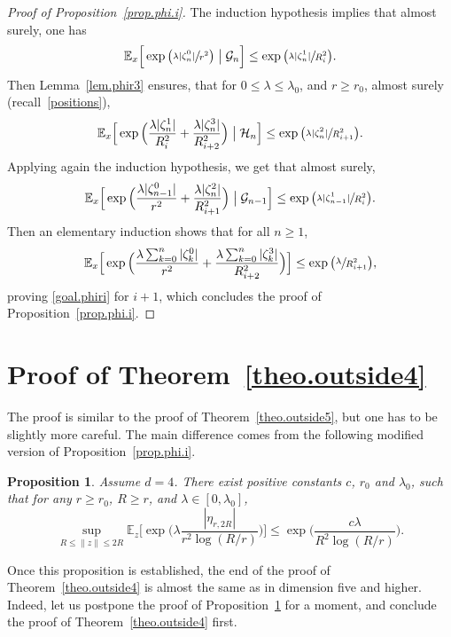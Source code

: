 \documentclass[11pt]{article}
\numberwithin{equation}{section}
\theoremstyle{plain}
\newtheorem{proposition}[theorem]{Proposition}
\theoremstyle{definition}
\newcommand{\1}{{\text{\Large $\mathfrak 1$}}}
\begin{document}
\begin{proof}[Proof of Proposition~\ref{prop.phi.i}]
The induction hypothesis implies that almost surely, one has
\[
\mathbb E_x\Big[\exp\big(\sfrac{\lambda |\zeta_n^0|}{r^2}\big) \bigm| \mathcal G_n \Big] \le \exp\big(\sfrac{\lambda|\zeta_n^1|}{R_i^2}\big).
\]
Then Lemma~\ref{lem.phir3} ensures,
that for $0\le \lambda \le \lambda_0$, and $r\ge r_0$, almost surely (recall~\eqref{positions}),
\[
\mathbb E_x\Big[\exp\Big(\frac{\lambda |\zeta_n^1|}{R_i^2}+ \frac{\lambda |\zeta^3_n|}{R_{i+2}^2}\Big) \bigm| \mathcal H_n \Big] \le
\exp\big(\sfrac{\lambda |\zeta_n^2|}{R_{i+1}^2}\big).
\]
Applying again the induction hypothesis, we get that almost surely,
\[
\mathbb E_x\Big[\exp\Big(\frac{\lambda |\zeta_{n-1}^0|}{r^2}+ \frac{\lambda |\zeta^2_n|}{R_{i+1}^2}\Big) \bigm| \mathcal G_{n-1} \Big]
\le \exp \big(\sfrac{\lambda |\zeta_{n-1}^1|}{R_i^2}\big).
\]
Then an elementary induction shows that for all $n\ge 1$,
\[
\mathbb E_x\Big[\exp\Big(\frac{\lambda\sum_{k=0}^n |\zeta_k^0|}{r^2}+\frac{\lambda\sum_{k=0}^n |\zeta^3_k|}{R_{i+2}^2}\Big)\Big]
\le \exp\big(\sfrac{\lambda}{R_{i+1}^2}\big),
\]
proving \eqref{goal.phiri} for $i+1$,
which concludes the proof of Proposition~\ref{prop.phi.i}.
\end{proof}

\section{Proof of Theorem~\ref{theo.outside4}}\label{sec-outside4}
The proof is similar to the proof of Theorem~\ref{theo.outside5},
but one has to be slightly more careful.
The main difference comes from the following modified version of Proposition~\ref{prop.phi.i}.

\begin{proposition}\label{prop.phi.d4}
Assume $d=4$. There exist positive constants $c$, $r_0$ and $\lambda_0$, such that for any $r\ge r_0$, $R\ge r$, and $\lambda\in[0,\lambda_0]$,
\[
\sup_{R\le \|z\|\le 2R} \mathbb E_z \Big[\exp\Big(\lambda\frac{|\eta_{r,2R}|}{r^2\log(R/r)}\Big)\Big] \le \exp\Big(\frac{c\lambda}{R^2\log(R/r)}\Big).
\]
\end{proposition}
Once this proposition is established, the end of the proof of Theorem~\ref{theo.outside4} is almost the same as in dimension five and higher. Indeed,
let us postpone the proof of Proposition~\ref{prop.phi.d4} for a moment, and conclude the proof of Theorem~\ref{theo.outside4} first.
\end{document}
